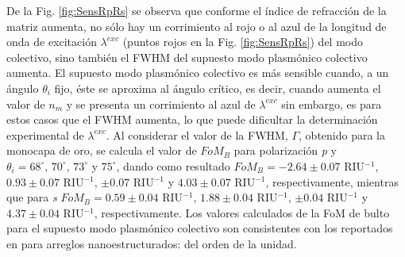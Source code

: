 De la Fig. \ref{fig:SensRpRs} se observa que conforme el índice de refracción de la matriz aumenta, no sólo hay un corrimiento al rojo o al azul de la longitud de onda de excitación $\lambda^{exc}$  (puntos rojos en la Fig. \ref{fig:SensRpRs}) del modo colectivo,  sino también  el FWHM del supuesto modo  plasmónico colectivo aumenta. El supuesto modo  plasmónico colectivo es más sensible cuando, a un ángulo  $\theta_i$ fijo, éste se aproxima al ángulo crítico, es decir, cuando aumenta el valor de $n_m$ y se presenta un corrimiento al azul de $\lambda^{exc}$  sin embargo, es para estos casos que el FWHM aumenta, lo que puede dificultar la determinación experimental de $\lambda^{exc}$. Al considerar el valor de la FWHM, $\Gamma$, obtenido para la monocapa de oro, se calcula el valor de $\textit{FoM}_B$ para polarización \emph{p} y $\theta_i=68^\circ,\, 70^\circ,\, 73^\circ$ y $75^\circ$, dando como resultado  $\textit{FoM}_B= -2.64\pm0.07$ RIU$^{-1}$, $0.93 \pm0.07$ RIU$^{-1}$, $ \pm0.07$ RIU$^{-1}$ y $4.03\pm0.07$ RIU$^{-1}$, respectivamente, mientras que para \emph{s} $\textit{FoM}_B= 0.59\pm0.04$ RIU$^{-1}$, $1.88 \pm0.04$ RIU$^{-1}$, $ \pm0.04 $ RIU$^{-1}$ y $4.37\pm0.04$ RIU$^{-1}$, respectivamente. Los valores calculados de la FoM de bulto para el supuesto modo plasmónico colectivo son consistentes con los reportados en \cite{svedendahl2009refractometric} para arreglos nanoestructurados: del orden de la unidad.

